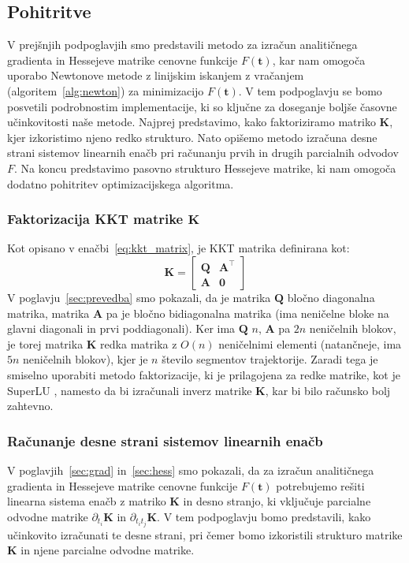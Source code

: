\documentclass[isrm2, tisk]{fmfdelo}
\newcommand{\qmat}{\mathbf{Q}}
\newcommand{\amat}{\mathbf{A}}
\newcommand{\kmat}{\mathbf{K}}
\newcommand{\tvec}{\mathbf{t}}
\begin{document}
\subsection{Pohitritve}

V prejšnjih podpoglavjih smo predstavili metodo za izračun analitičnega gradienta in Hessejeve matrike cenovne funkcije $F(\tvec)$, kar nam omogoča uporabo Newtonove metode z linijskim iskanjem z vračanjem (algoritem~\ref{alg:newton}) za minimizacijo $F(\tvec)$. V tem podpoglavju se bomo posvetili podrobnostim implementacije, ki so ključne za doseganje boljše časovne učinkovitosti naše metode. Najprej predstavimo, kako faktoriziramo matriko $\kmat$, kjer izkoristimo njeno redko strukturo. Nato opišemo metodo izračuna desne strani sistemov linearnih enačb pri računanju prvih in drugih parcialnih odvodov $F$. Na koncu predstavimo pasovno strukturo Hessejeve matrike, ki nam omogoča dodatno pohitritev optimizacijskega algoritma.

\subsubsection{Faktorizacija KKT matrike $\kmat$}
Kot opisano v enačbi~\eqref{eq:kkt_matrix}, je KKT matrika definirana kot:
\begin{equation}
    \kmat = \begin{bmatrix}
        \qmat & \amat^{\top} \\
        \amat & \mathbf{0}
    \end{bmatrix}
\end{equation}
V poglavju~\ref{sec:prevedba} smo pokazali, da je matrika $\qmat$ bločno diagonalna matrika, matrika $\amat$ pa je bločno bidiagonalna matrika (ima neničelne bloke na glavni diagonali in prvi poddiagonali). Ker ima $\qmat$ $n$, $\amat$ pa $2n$ neničelnih blokov, je torej matrika $\kmat$ redka matrika z $O(n)$ neničelnimi elementi (natančneje, ima $5n$ neničelnih blokov), kjer je $n$ število segmentov trajektorije. Zaradi tega je smiselno uporabiti metodo faktorizacije, ki je prilagojena za redke matrike, kot je SuperLU \cite{superlu_ug99}, namesto da bi izračunali inverz matrike $\kmat$, kar bi bilo računsko bolj zahtevno.

\subsubsection{Računanje desne strani sistemov linearnih enačb}
\label{sec:rhs}

V poglavjih~\ref{sec:grad} in~\ref{sec:hess} smo pokazali, da za izračun analitičnega gradienta in Hessejeve matrike cenovne funkcije $F(\tvec)$ potrebujemo rešiti linearna sistema enačb z matriko $\kmat$ in desno stranjo, ki vključuje parcialne odvodne matrike $\partial_{t_i}\kmat$ in $\partial_{t_it_j}\kmat$. V tem podpoglavju bomo predstavili, kako učinkovito izračunati te desne strani, pri čemer bomo izkoristili strukturo matrike $\kmat$ in njene parcialne odvodne matrike.
\end{document}
